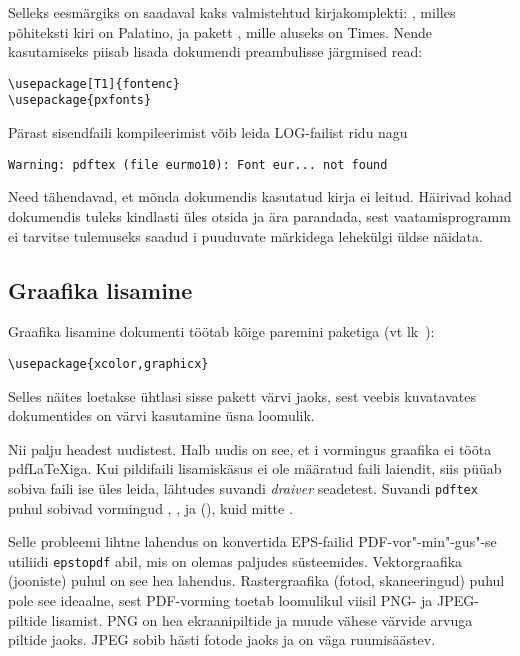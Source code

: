 Selleks eesmärgiks on saadaval kaks valmistehtud kirjakomplekti:
, milles põhiteksti kiri on Palatino,
ja pakett , mille aluseks on Times. Nende
kasutamiseks piisab lisada dokumendi preambulisse järgmised read:
\begin{code}
\begin{verbatim}
\usepackage[T1]{fontenc}
\usepackage{pxfonts}
\end{verbatim}
\end{code}

Pärast sisendfaili kompileerimist võib leida LOG-failist ridu nagu
\begin{verbatim}
Warning: pdftex (file eurmo10): Font eur... not found
\end{verbatim}
Need tähendavad, et mõnda dokumendis kasutatud kirja ei leitud. Häirivad
kohad dokumendis tuleks kindlasti üles otsida ja ära parandada, sest
vaatamisprogramm ei tarvitse tulemuseks saadud i puuduvate
märkidega lehekülgi üldse näidata.

\subsection{Graafika lisamine}
\label{ssec:pdfgraph}

Graafika lisamine dokumenti töötab kõige paremini paketiga
 (vt lk~\pageref{eps}):
\begin{code}
\begin{verbatim}
\usepackage{xcolor,graphicx}
\end{verbatim}
\end{code}
Selles näites loetakse ühtlasi sisse pakett  värvi jaoks,
sest veebis kuvatavates dokumentides on värvi kasutamine üsna loomulik.

Nii palju headest uudistest. Halb uudis on see, et \ePSi i
vormingus graafika ei tööta pdf\LaTeX iga. Kui pildifaili lisamiskäsus
 ei ole määratud faili laiendit, siis püüab
 sobiva faili ise üles leida, lähtudes suvandi
\emph{draiver} seadetest. Suvandi \texttt{pdftex} puhul sobivad
vormingud , ,  ja 
(\MP{}), kuid mitte .

Selle probleemi lihtne lahendus on konvertida EPS-failid
PDF-vor"-min"-gus"-se
utiliidi \texttt{epstopdf} abil, mis
on olemas paljudes süsteemides. Vektorgraafika (jooniste) puhul on see
hea lahendus. Rastergraafika (fotod, skaneeringud) puhul pole see
ideaalne, sest PDF-vorming toetab loomulikul viisil PNG- ja JPEG-piltide
lisamist. PNG on hea ekraanipiltide ja muude vähese värvide arvuga
piltide jaoks. JPEG sobib hästi fotode jaoks ja on väga ruumisäästev.

